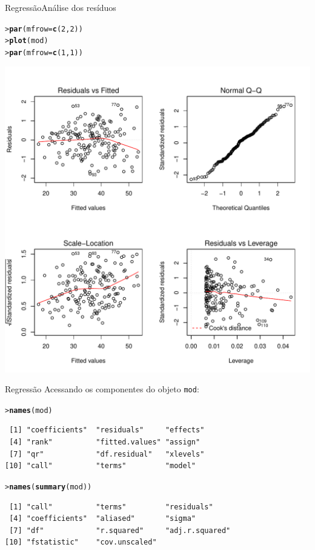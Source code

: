 \documentclass[10pt]{beamer}\usepackage{graphicx, color}
\makeatletter
\newcommand{\hlfunctioncall}[1]{\textcolor[rgb]{0,0,0.545098039215686}{\textbf{#1}}}%
\newenvironment{kframe}{%
 \def\at@end@of@kframe{}%
 \ifinner\ifhmode%
  \def\at@end@of@kframe{\end{minipage}}%
  \begin{minipage}{\columnwidth}%
 \fi\fi%
 \def\FrameCommand##1{\hskip\@totalleftmargin \hskip-\fboxsep
 \colorbox{shadecolor}{##1}\hskip-\fboxsep
     \hskip-\linewidth \hskip-\@totalleftmargin \hskip\columnwidth}%
 \MakeFramed {\advance\hsize-\width
   \@totalleftmargin\z@ \linewidth\hsize
   \@setminipage}}%
 {\par\unskip\endMakeFramed%
 \at@end@of@kframe}
\newenvironment{knitrout}{}{} %
\makeatother
\begin{document}
\begin{frame}[fragile=singleslide]{Regressão}{Análise dos resíduos}
\begin{knitrout}\small
{}\color{fgcolor}\begin{kframe}
\begin{alltt}
> \hlfunctioncall{par}(mfrow = \hlfunctioncall{c}(2,2))
> \hlfunctioncall{plot}(mod)
> \hlfunctioncall{par}(mfrow = \hlfunctioncall{c}(1,1))
\end{alltt}
\end{kframe}

{\centering \includegraphics[width=.6\textwidth]{figure/unnamed-chunk-18} 

}


\end{knitrout}

\end{frame}

\begin{frame}[fragile=singleslide]{Regressão}
Acessando os componentes do objeto \texttt{mod}:
\begin{knitrout}\small
{}\color{fgcolor}\begin{kframe}
\begin{alltt}
> \hlfunctioncall{names}(mod)
\end{alltt}
\begin{verbatim}
 [1] "coefficients"  "residuals"     "effects"      
 [4] "rank"          "fitted.values" "assign"       
 [7] "qr"            "df.residual"   "xlevels"      
[10] "call"          "terms"         "model"        
\end{verbatim}
\begin{alltt}
> \hlfunctioncall{names}(\hlfunctioncall{summary}(mod))
\end{alltt}
\begin{verbatim}
 [1] "call"          "terms"         "residuals"    
 [4] "coefficients"  "aliased"       "sigma"        
 [7] "df"            "r.squared"     "adj.r.squared"
[10] "fstatistic"    "cov.unscaled" 
\end{verbatim}
\end{kframe}
\end{knitrout}

\end{frame}
\end{document}
